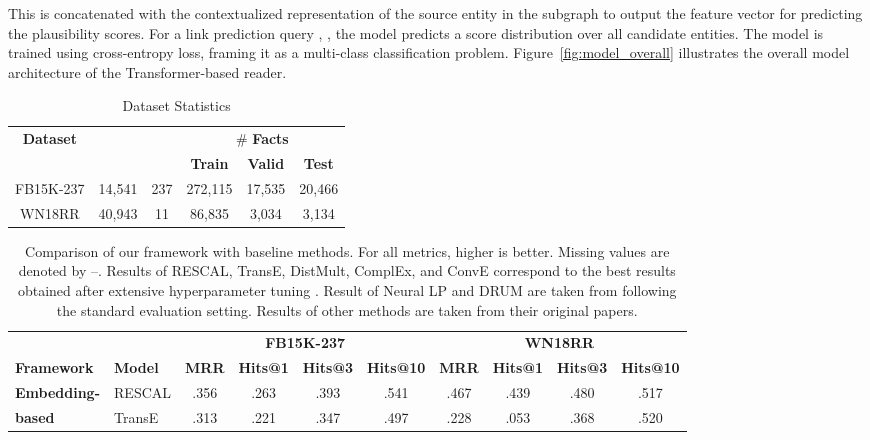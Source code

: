 \noindent This is concatenated with the contextualized representation of the source entity in the subgraph to output the feature vector for predicting the plausibility scores.
For a link prediction query \eg, , the model predicts a score distribution over all candidate entities. The model is trained using cross-entropy loss, framing it as a multi-class classification problem. Figure~\ref{fig:model_overall} illustrates the overall model architecture of the Transformer-based reader.
\begin{table}[htbp]
\centering
\caption{Dataset Statistics}
\label{tab:dataset_stat}
\begin{tabular}{cccccc}
\toprule
\bfseries Dataset   &       & \bfseries    & \multicolumn{3}{c}{\# \bfseries Facts} \\ \cmidrule{4-6}
          &        &     & \bfseries Train    & \bfseries Valid   & \bfseries Test                      \\ \midrule
FB15K-237 & 14,541 & 237 & 272,115  & 17,535  & 20,466            \\
WN18RR    & 40,943 & 11  & 86,835   & 3,034   & 3,134       \\ \bottomrule        
\end{tabular}
\end{table} \begin{table*}[htbp]
\centering
\caption{Comparison of our framework with baseline methods. For all metrics, higher is better. Missing values are denoted by --. Results of RESCAL, TransE, DistMult, ComplEx, and ConvE correspond to the best results obtained after extensive hyperparameter tuning \citep{Ruffinelli2020You}.
Result of Neural LP and DRUM are taken from \citet{DBLP:conf/iclr/QuCXBT21} following the standard evaluation setting.
Results of other methods are taken from their original papers.
}
\label{tab:results_overall}
\begin{tabular}{llcccc|cccc}
\toprule
& & \multicolumn{4}{c}{\bfseries FB15K-237} & \multicolumn{4}{c}{\bfseries WN18RR} \\ \cmidrule{2-10}
\bfseries Framework & \bfseries Model                                  & \bfseries MRR        & \bfseries Hits@1    & \bfseries Hits@3    & \bfseries Hits@10   & \bfseries MRR      & \bfseries Hits@1   & \bfseries Hits@3   & \bfseries Hits@10   \\ \midrule
\textbf{Embedding-} & RESCAL \citep{nickel2011three} & .356	& .263 & .393 & .541 & .467	& .439 & .480 & .517 \\
\textbf{based} & TransE \citep{bordes2013translating} & .313 & .221 & .347 & .497 & .228 & .053 & .368 & .520  \\

\end{tabular}
\end{table*}
